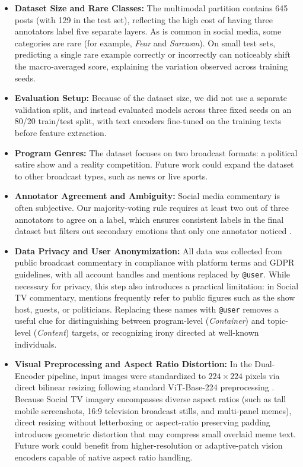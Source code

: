 \begin{itemize}
    \item \textbf{Dataset Size and Rare Classes:} The multimodal partition contains 645 posts (with 129 in the test set), reflecting the high cost of having three annotators label five separate layers. As is common in social media, some categories are rare (for example, \textit{Fear} and \textit{Sarcasm}). On small test sets, predicting a single rare example correctly or incorrectly can noticeably shift the macro-averaged score, explaining the variation observed across training seeds.
    \item \textbf{Evaluation Setup:} Because of the dataset size, we did not use a separate validation split, and instead evaluated models across three fixed seeds on an 80/20 train/test split, with text encoders fine-tuned on the training texts before feature extraction.
    \item \textbf{Program Genres:} The dataset focuses on two broadcast formats: a political satire show and a reality competition. Future work could expand the dataset to other broadcast types, such as news or live sports.
    \item \textbf{Annotator Agreement and Ambiguity:} Social media commentary is often subjective. Our majority-voting rule requires at least two out of three annotators to agree on a label, which ensures consistent labels in the final dataset but filters out secondary emotions that only one annotator noticed \cite{basile2021disagreement}.
    \item \textbf{Data Privacy and User Anonymization:} All data was collected from public broadcast commentary in compliance with platform terms and GDPR guidelines, with all account handles and mentions replaced by \texttt{@user}. While necessary for privacy, this step also introduces a practical limitation: in Social TV commentary, mentions frequently refer to public figures such as the show host, guests, or politicians. Replacing these names with \texttt{@user} removes a useful clue for distinguishing between program-level (\textit{Container}) and topic-level (\textit{Content}) targets, or recognizing irony directed at well-known individuals.
    \item \textbf{Visual Preprocessing and Aspect Ratio Distortion:} In the Dual-Encoder pipeline, input images were standardized to $224 \times 224$ pixels via direct bilinear resizing following standard ViT-Base-224 preprocessing \cite{dosovitskiy2021vit}. Because Social TV imagery encompasses diverse aspect ratios (such as tall mobile screenshots, 16:9 television broadcast stills, and multi-panel memes), direct resizing without letterboxing or aspect-ratio preserving padding introduces geometric distortion that may compress small overlaid meme text. Future work could benefit from higher-resolution or adaptive-patch vision encoders capable of native aspect ratio handling.
\end{itemize}
